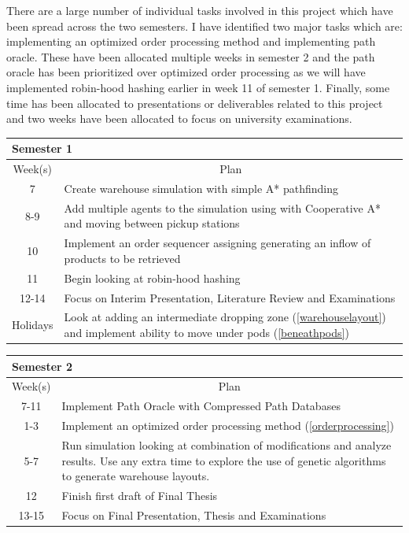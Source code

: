 \documentclass[a4paper,11pt]{article}
\begin{document}
There are a large number of individual tasks involved in this project which have been spread across the two semesters. I have identified two major tasks which are: implementing an optimized order processing method and implementing path oracle. These have been allocated multiple weeks in semester 2 and the path oracle has been prioritized over optimized order processing as we will have implemented robin-hood hashing earlier in week 11 of semester 1. Finally, some time has been allocated to presentations or deliverables related to this project and two weeks have been allocated to focus on university examinations.

\begin{center}
{\footnotesize
\begin{tabular}{ c p{12cm} }
\multicolumn{2}{l}{\textbf{Semester 1}} \\
\hline \multicolumn{1}{c}{Week(s)} & \multicolumn{1}{c}{Plan} \\
\hline 7  & Create warehouse simulation with simple A* pathfinding \\
\hline 8-9  & Add multiple agents to the simulation using with Cooperative A* and moving between pickup stations \\
\hline 10 & Implement an order sequencer assigning generating an inflow of products to be retrieved \\
\hline 11 & Begin looking at robin-hood hashing \\
\hline 12-14 & Focus on Interim Presentation, Literature Review and Examinations \\
\hline Holidays & Look at adding an intermediate dropping zone (\ref{warehouselayout}) and implement ability to move under pods (\ref{beneathpods}) \\
\hline
\end{tabular}
}

{\footnotesize
\vspace{0.5cm}
\begin{tabular}{ c p{12cm} }
\multicolumn{2}{l}{\textbf{Semester 2}} \\
\hline \multicolumn{1}{c}{Week(s)} & \multicolumn{1}{c}{Plan} \\

\hline 7-11 & Implement Path Oracle with Compressed Path Databases \\

\hline 1-3 & Implement an optimized order processing method (\ref{orderprocessing}) \\
\hline 5-7 & Run simulation looking at combination of modifications and analyze results. Use any extra time to explore the use of genetic algorithms to generate warehouse layouts. \\
\hline 12 & Finish first draft of Final Thesis \\
\hline 13-15 & Focus on Final Presentation, Thesis and Examinations \\
\hline
\end{tabular}
}
\end{center}
\end{document}
